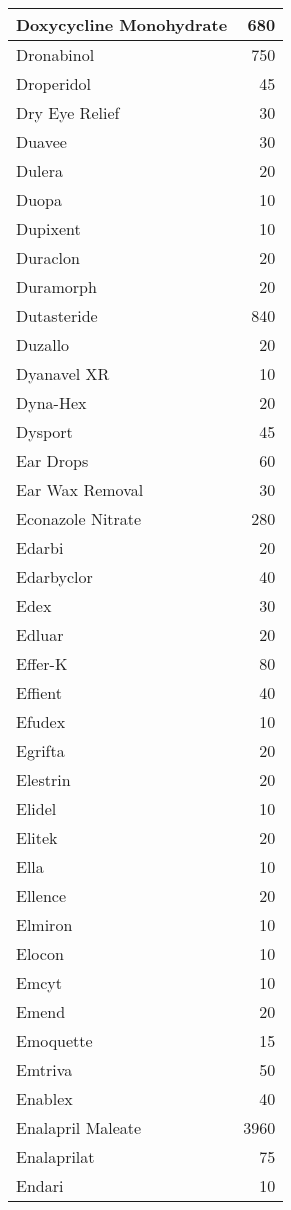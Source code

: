 \documentclass[
]{article}
\begin{document}
\begin{table}
\begin{tabular}[t]{l|r}
\hline
Doxycycline Monohydrate & 680\\
\hline
Dronabinol & 750\\
\hline
Droperidol & 45\\
\hline
Dry Eye Relief & 30\\
\hline
Duavee & 30\\
\hline
Dulera & 20\\
\hline
Duopa & 10\\
\hline
Dupixent & 10\\
\hline
Duraclon & 20\\
\hline
Duramorph & 20\\
\hline
Dutasteride & 840\\
\hline
Duzallo & 20\\
\hline
Dyanavel XR & 10\\
\hline
Dyna-Hex & 20\\
\hline
Dysport & 45\\
\hline
Ear Drops & 60\\
\hline
Ear Wax Removal & 30\\
\hline
Econazole Nitrate & 280\\
\hline
Edarbi & 20\\
\hline
Edarbyclor & 40\\
\hline
Edex & 30\\
\hline
Edluar & 20\\
\hline
Effer-K & 80\\
\hline
Effient & 40\\
\hline
Efudex & 10\\
\hline
Egrifta & 20\\
\hline
Elestrin & 20\\
\hline
Elidel & 10\\
\hline
Elitek & 20\\
\hline
Ella & 10\\
\hline
Ellence & 20\\
\hline
Elmiron & 10\\
\hline
Elocon & 10\\
\hline
Emcyt & 10\\
\hline
Emend & 20\\
\hline
Emoquette & 15\\
\hline
Emtriva & 50\\
\hline
Enablex & 40\\
\hline
Enalapril Maleate & 3960\\
\hline
Enalaprilat & 75\\
\hline
Endari & 10\\

\end{tabular}
\end{table}
\end{document}
